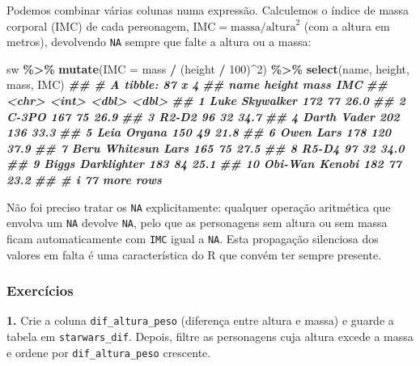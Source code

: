 \documentclass[
  portuguese,
  11pt,
  openany]{book}
\newenvironment{Shaded}{\begin{snugshade}}{\end{snugshade}}
\newcommand{\AttributeTok}[1]{\textcolor[rgb]{0.13,0.29,0.53}{#1}}
\newcommand{\DecValTok}[1]{\textcolor[rgb]{0.00,0.00,0.81}{#1}}
\newcommand{\DocumentationTok}[1]{\textcolor[rgb]{0.56,0.35,0.01}{\textbf{\textit{#1}}}}
\newcommand{\FunctionTok}[1]{\textcolor[rgb]{0.13,0.29,0.53}{\textbf{#1}}}
\newcommand{\NormalTok}[1]{#1}
\newcommand{\SpecialCharTok}[1]{\textcolor[rgb]{0.81,0.36,0.00}{\textbf{#1}}}
\begin{document}
Podemos combinar várias colunas numa expressão. Calculemos o índice de massa corporal
(IMC) de cada personagem, \(\text{IMC} = \text{massa} / \text{altura}^2\) (com a altura
em metros), devolvendo \texttt{NA} sempre que falte a altura ou a massa:

\begin{Shaded}
\begin{Highlighting}[]
\NormalTok{sw }\SpecialCharTok{\%\textgreater{}\%}
  \FunctionTok{mutate}\NormalTok{(}\AttributeTok{IMC =}\NormalTok{ mass }\SpecialCharTok{/}\NormalTok{ (height }\SpecialCharTok{/} \DecValTok{100}\NormalTok{)}\SpecialCharTok{\^{}}\DecValTok{2}\NormalTok{) }\SpecialCharTok{\%\textgreater{}\%}
  \FunctionTok{select}\NormalTok{(name, height, mass, IMC)}
\DocumentationTok{\#\# \# A tibble: 87 x 4}
\DocumentationTok{\#\#    name               height  mass   IMC}
\DocumentationTok{\#\#    \textless{}chr\textgreater{}               \textless{}int\textgreater{} \textless{}dbl\textgreater{} \textless{}dbl\textgreater{}}
\DocumentationTok{\#\#  1 Luke Skywalker        172    77  26.0}
\DocumentationTok{\#\#  2 C{-}3PO                 167    75  26.9}
\DocumentationTok{\#\#  3 R2{-}D2                  96    32  34.7}
\DocumentationTok{\#\#  4 Darth Vader           202   136  33.3}
\DocumentationTok{\#\#  5 Leia Organa           150    49  21.8}
\DocumentationTok{\#\#  6 Owen Lars             178   120  37.9}
\DocumentationTok{\#\#  7 Beru Whitesun Lars    165    75  27.5}
\DocumentationTok{\#\#  8 R5{-}D4                  97    32  34.0}
\DocumentationTok{\#\#  9 Biggs Darklighter     183    84  25.1}
\DocumentationTok{\#\# 10 Obi{-}Wan Kenobi        182    77  23.2}
\DocumentationTok{\#\# \# i 77 more rows}
\end{Highlighting}
\end{Shaded}

Não foi preciso tratar os \texttt{NA} explicitamente: qualquer operação aritmética que
envolva um \texttt{NA} devolve \texttt{NA}, pelo que as personagens sem altura ou sem massa ficam
automaticamente com \texttt{IMC} igual a \texttt{NA}. Esta propagação silenciosa dos valores em falta
é uma característica do R que convém ter sempre presente.

\subsubsection{Exercícios}\label{exercuxedcios-18}

\textbf{1.} Crie a coluna \texttt{dif\_altura\_peso} (diferença entre altura e massa) e guarde a
tabela em \texttt{starwars\_dif}. Depois, filtre as personagens cuja altura excede a massa e
ordene por \texttt{dif\_altura\_peso} crescente.
\end{document}
